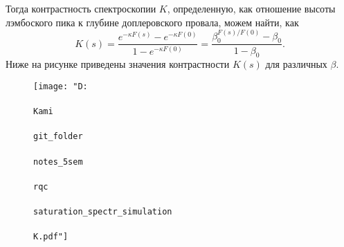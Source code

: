 Тогда контрастность спектроскопии $K$, определенную, как отношение высоты лэмбоского пика к глубине доплеровского провала, можем найти, как
\begin{equation*}
    K(s) = \frac{e^{-\kappa F(s)}-e^{-\kappa F(0)}}{1-e^{-\kappa F(0)}} = 
    \frac{\beta_0^{F(s)/F(0)}-\beta_0}{1-\beta_0}.
\end{equation*}
Ниже на рисунке приведены значения контрастности $K(s)$ для различных $\beta$.

\begin{figure}[h]
    \centering
    \texttt{[image: "D:\\\\Kami\\\\git\_folder\\\\notes\_5sem\\\\rqc\\\\saturation\_spectr\_simulation\\\\K.pdf"]}
\end{figure}


